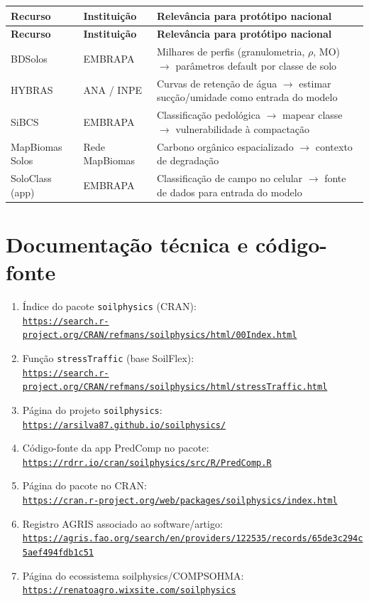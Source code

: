 \documentclass[12pt,a4paper]{article}
\newcommand{\Section}[1]{\needspace{12\baselineskip}\section{#1}}
\newcommand{\Link}[1]{\href{#1}{\nolinkurl{#1}}}
\newenvironment{NoBreakEnumerate}
{\begin{samepage}\begin{enumerate}}
{\end{enumerate}\end{samepage}}
\begin{document}
\begin{longtable}{>{\raggedright}p{3.2cm} >{\raggedright}p{3cm} >{\raggedright\arraybackslash}p{7cm}}
\toprule
\textbf{Recurso} & \textbf{Instituição} & \textbf{Relevância para protótipo nacional} \\
\midrule
\endfirsthead
\toprule
\textbf{Recurso} & \textbf{Instituição} & \textbf{Relevância para protótipo nacional} \\
\midrule
\endhead
\bottomrule
\endfoot
BDSolos              & EMBRAPA       & Milhares de perfis (granulometria, $\rho$, MO) $\to$ parâmetros default por classe de solo \\
HYBRAS               & ANA / INPE    & Curvas de retenção de água $\to$ estimar sucção/umidade como entrada do modelo \\
SiBCS                & EMBRAPA       & Classificação pedológica $\to$ mapear classe $\to$ vulnerabilidade à compactação \\
MapBiomas Solos      & Rede MapBiomas & Carbono orgânico espacializado $\to$ contexto de degradação \\
SoloClass (app)      & EMBRAPA       & Classificação de campo no celular $\to$ fonte de dados para entrada do modelo \\
\end{longtable}

\Section{Documentação técnica e código-fonte}
\begin{NoBreakEnumerate}
  \item Índice do pacote \texttt{soilphysics} (CRAN):\\
  \Link{https://search.r-project.org/CRAN/refmans/soilphysics/html/00Index.html}

  \item Função \texttt{stressTraffic} (base SoilFlex):\\
  \Link{https://search.r-project.org/CRAN/refmans/soilphysics/html/stressTraffic.html}

  \item Página do projeto \texttt{soilphysics}:\\
  \Link{https://arsilva87.github.io/soilphysics/}

  \item Código-fonte da app PredComp no pacote:\\
  \Link{https://rdrr.io/cran/soilphysics/src/R/PredComp.R}

  \item Página do pacote no CRAN:\\
  \Link{https://cran.r-project.org/web/packages/soilphysics/index.html}

  \item Registro AGRIS associado ao software/artigo:\\
  \Link{https://agris.fao.org/search/en/providers/122535/records/65de3c294c5aef494fdb1c51}

  \item Página do ecossistema soilphysics/COMPSOHMA:\\
  \Link{https://renatoagro.wixsite.com/soilphysics}
\end{NoBreakEnumerate}
\end{document}
